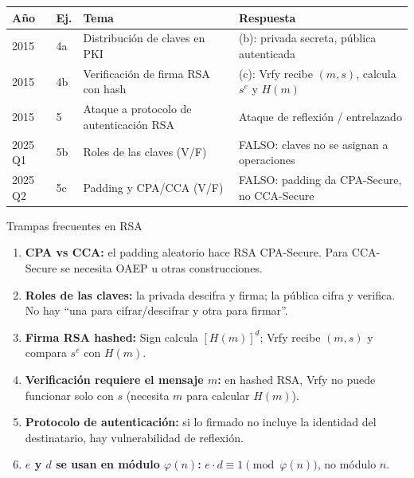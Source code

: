 \documentclass[11pt,a4paper]{article}
\begin{document}
\begin{center}
\renewcommand{\arraystretch}{1.4}
\begin{tabular}{llll}
\toprule
\textbf{Año} & \textbf{Ej.} & \textbf{Tema} & \textbf{Respuesta} \\
\midrule
2015 & 4a & Distribución de claves en PKI & (b): privada secreta, pública autenticada \\
2015 & 4b & Verificación de firma RSA con hash & (c): Vrfy recibe $(m,s)$, calcula $s^e$ y $H(m)$ \\
2015 & 5 & Ataque a protocolo de autenticación RSA & Ataque de reflexión / entrelazado \\
2025 Q1 & 5b & Roles de las claves (V/F) & FALSO: claves no se asignan a operaciones \\
2025 Q2 & 5c & Padding y CPA/CCA (V/F) & FALSO: padding da CPA-Secure, no CCA-Secure \\
\bottomrule
\end{tabular}
\end{center}

\begin{warnbox}{Trampas frecuentes en RSA}
\begin{enumerate}
  \item \textbf{CPA vs CCA:} el padding aleatorio hace RSA CPA-Secure. Para CCA-Secure se necesita OAEP u otras construcciones.
  \item \textbf{Roles de las claves:} la privada descifra y firma; la pública cifra y verifica. No hay ``una para cifrar/descifrar y otra para firmar''.
  \item \textbf{Firma RSA hashed:} Sign calcula $[H(m)]^d$; Vrfy recibe $(m,s)$ y compara $s^e$ con $H(m)$.
  \item \textbf{Verificación requiere el mensaje $m$:} en hashed RSA, Vrfy no puede funcionar solo con $s$ (necesita $m$ para calcular $H(m)$).
  \item \textbf{Protocolo de autenticación:} si lo firmado no incluye la identidad del destinatario, hay vulnerabilidad de reflexión.
  \item \textbf{$e$ y $d$ se usan en módulo $\varphi(n)$:} $e \cdot d \equiv 1 \pmod{\varphi(n)}$, no módulo $n$.
\end{enumerate}
\end{warnbox}
\end{document}

